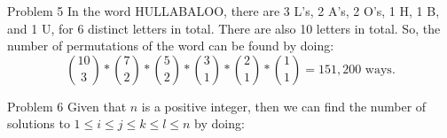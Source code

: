 \documentclass[12pt]{article}
\begin{document}
    \begin{problem}{Problem 5}
        In the word HULLABALOO, there are 3 L's, 2 A's, 2 O's, 1 H, 1 B, and 1 U, for 6 distinct letters in total.
        There are also 10 letters in total. So, the number of permutations of the word can be found by doing:
        \[\binom{10}{3} * \binom{7}{2} * \binom{5}{2} * \binom{3}{1} * \binom{2}{1} * \binom{1}{1} = 151,200 \text{ ways.}\]
    \end{problem}

    \begin{problem}{Problem 6}
        Given that $n$ is a positive integer, then we can find the number of solutions to $1 \leq i \leq j \leq k \leq l \leq n$ by doing:
        
    \end{problem}
\end{document}
